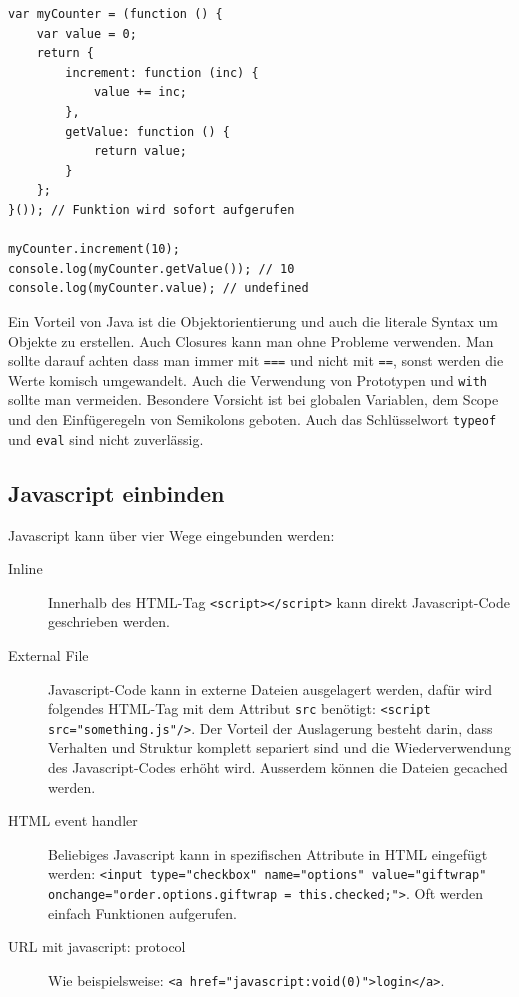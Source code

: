 \begin{lstlisting}[label=lst:closure,caption=Closure]
var myCounter = (function () {
	var value = 0;
	return {
		increment: function (inc) {
			value += inc;
		},
		getValue: function () {
			return value;
		}
	};
}()); // Funktion wird sofort aufgerufen

myCounter.increment(10);
console.log(myCounter.getValue()); // 10
console.log(myCounter.value); // undefined
\end{lstlisting}

Ein Vorteil von Java ist die Objektorientierung und auch die literale Syntax um Objekte zu erstellen. Auch Closures kann man ohne Probleme verwenden. Man sollte darauf achten dass man immer mit \lstinline|===| und nicht mit \lstinline|==|, sonst werden die Werte komisch umgewandelt. Auch die Verwendung von Prototypen und \lstinline|with| sollte man vermeiden. Besondere Vorsicht ist bei globalen Variablen, dem Scope und den Einfügeregeln von Semikolons geboten. Auch das Schlüsselwort \lstinline|typeof| und \lstinline|eval| sind nicht zuverlässig.

\newpage

\subsection{Javascript einbinden}
Javascript kann über vier Wege eingebunden werden:
\begin{description}
	\item[Inline] Innerhalb des HTML-Tag \lstinline|<script></script>| kann direkt Javascript-Code geschrieben werden.
	\item[External File] Javascript-Code kann in externe Dateien ausgelagert werden, dafür wird folgendes HTML-Tag mit dem Attribut \lstinline|src| benötigt: \lstinline|<script src="something.js"/>|. Der Vorteil der Auslagerung besteht darin, dass Verhalten und Struktur komplett separiert sind und die Wiederverwendung des Javascript-Codes erhöht wird. Ausserdem können die Dateien gecached werden.
	\item[HTML event handler] Beliebiges Javascript kann in spezifischen Attribute in HTML eingefügt werden: \lstinline|<input type="checkbox" name="options" value="giftwrap" onchange="order.options.giftwrap = this.checked;">|. Oft werden einfach Funktionen aufgerufen.
	\item[URL mit javascript: protocol] Wie beispielsweise: \lstinline|<a href="javascript:void(0)">login</a>|.
\end{description}

